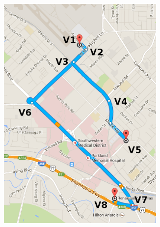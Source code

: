 \begin{frame}[red]
\begin{columns}
  \begin{column}[t]{0.5\textwidth}
  \vspace{-2em}
    \begin{figure}
    \includegraphics[width=0.73\textwidth]{figures/pathoverlap.png} 
    \end{figure}
  \end{column}
\end{columns}
\end{frame}





